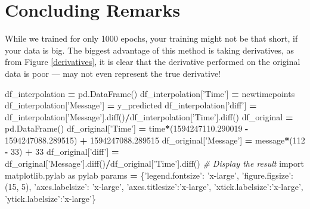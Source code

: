 \documentclass[onecolumn]{article}
\newenvironment{Shaded}{\begin{snugshade}}{\end{snugshade}}
\newcommand{\DecValTok}[1]{\textcolor[rgb]{0.00,0.00,0.81}{#1}}
\newcommand{\FloatTok}[1]{\textcolor[rgb]{0.00,0.00,0.81}{#1}}
\newcommand{\StringTok}[1]{\textcolor[rgb]{0.31,0.60,0.02}{#1}}
\newcommand{\ImportTok}[1]{#1}
\newcommand{\CommentTok}[1]{\textcolor[rgb]{0.56,0.35,0.01}{\textit{#1}}}
\newcommand{\OperatorTok}[1]{\textcolor[rgb]{0.81,0.36,0.00}{\textbf{#1}}}
\newcommand{\NormalTok}[1]{#1}
\begin{document}
\section{Concluding Remarks}\label{concluding-remarks}

While we trained for only 1000 epochs, your training might not be that
short, if your data is big. The biggest advantage of this method is
taking derivatives, as from Figure \ref{derivatives}, it is clear that
the derivative performed on the original data is poor --- may not even
represent the true derivative!

\begin{Shaded}
\begin{Highlighting}[]
\NormalTok{df_interpolation }\OperatorTok{=}\NormalTok{ pd.DataFrame()}
\NormalTok{df_interpolation[}\StringTok{'Time'}\NormalTok{] }\OperatorTok{=}\NormalTok{ newtimepoints}
\NormalTok{df_interpolation[}\StringTok{'Message'}\NormalTok{] }\OperatorTok{=}\NormalTok{ y_predicted}
\NormalTok{df_interpolation[}\StringTok{'diff'}\NormalTok{] }\OperatorTok{=}
\NormalTok{    df_interpolation[}\StringTok{'Message'}\NormalTok{].diff()}\OperatorTok{/}\NormalTok{df_interpolation[}\StringTok{'Time'}\NormalTok{].diff()}
\NormalTok{df_original }\OperatorTok{=}\NormalTok{ pd.DataFrame()}
\NormalTok{df_original[}\StringTok{'Time'}\NormalTok{] }\OperatorTok{=}\NormalTok{ time}\OperatorTok{*}\NormalTok{(}\FloatTok{1594247110.290019} \OperatorTok{-} \FloatTok{1594247088.289515}\NormalTok{) }\OperatorTok{+} \FloatTok{1594247088.289515}
\NormalTok{df_original[}\StringTok{'Message'}\NormalTok{]  }\OperatorTok{=}\NormalTok{ message}\OperatorTok{*}\NormalTok{(}\DecValTok{112} \OperatorTok{-} \DecValTok{33}\NormalTok{) }\OperatorTok{+} \DecValTok{33}
\NormalTok{df_original[}\StringTok{'diff'}\NormalTok{] }\OperatorTok{=}\NormalTok{ df_original[}\StringTok{'Message'}\NormalTok{].diff()}\OperatorTok{/}\NormalTok{df_original[}\StringTok{'Time'}\NormalTok{].diff()}
\CommentTok{# Display the result}
\ImportTok{import}\NormalTok{ matplotlib.pylab }\ImportTok{as}\NormalTok{ pylab}
\NormalTok{params }\OperatorTok{=}\NormalTok{ \{}\StringTok{'legend.fontsize'}\NormalTok{: }\StringTok{'x-large'}\NormalTok{,}
          \StringTok{'figure.figsize'}\NormalTok{: (}\DecValTok{15}\NormalTok{, }\DecValTok{5}\NormalTok{),}
         \StringTok{'axes.labelsize'}\NormalTok{: }\StringTok{'x-large'}\NormalTok{,}
         \StringTok{'axes.titlesize'}\NormalTok{:}\StringTok{'x-large'}\NormalTok{,}
         \StringTok{'xtick.labelsize'}\NormalTok{:}\StringTok{'x-large'}\NormalTok{,}
         \StringTok{'ytick.labelsize'}\NormalTok{:}\StringTok{'x-large'}\NormalTok{\}}

\end{Highlighting}
\end{Shaded}
\end{document}
